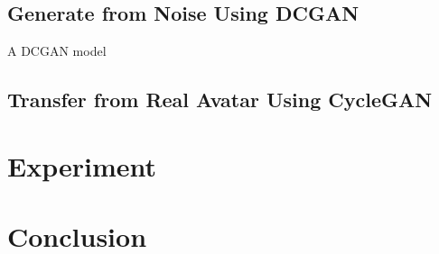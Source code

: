 \documentclass[10pt,twocolumn,letterpaper]{article}
\begin{document}
\subsection{Generate from Noise Using DCGAN}
A DCGAN model


\subsection{Transfer from Real Avatar Using CycleGAN}

\section{Experiment}

\section{Conclusion}

{\small


}
\end{document}

